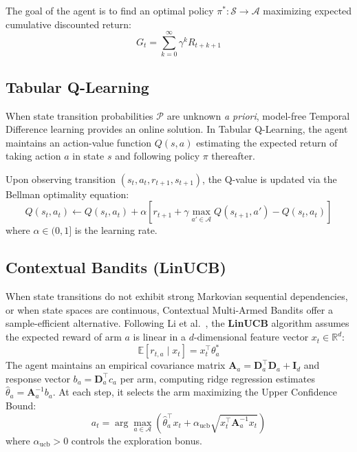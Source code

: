 The goal of the agent is to find an optimal policy $\pi^* : \mathcal{S} \rightarrow \mathcal{A}$ maximizing expected cumulative discounted return:
\begin{equation}
    G_t = \sum_{k=0}^{\infty} \gamma^k R_{t+k+1}
\end{equation}

\subsection{Tabular Q-Learning}
When state transition probabilities $\mathcal{P}$ are unknown \textit{a priori}, model-free Temporal Difference learning provides an online solution. In Tabular Q-Learning, the agent maintains an action-value function $Q(s, a)$ estimating the expected return of taking action $a$ in state $s$ and following policy $\pi$ thereafter.

Upon observing transition $(s_t, a_t, r_{t+1}, s_{t+1})$, the Q-value is updated via the Bellman optimality equation:
\begin{equation}
    Q(s_t, a_t) \leftarrow Q(s_t, a_t) + \alpha \left[ r_{t+1} + \gamma \max_{a' \in \mathcal{A}} Q(s_{t+1}, a') - Q(s_t, a_t) \right]
\end{equation}
where $\alpha \in (0, 1]$ is the learning rate.

\subsection{Contextual Bandits (LinUCB)}
When state transitions do not exhibit strong Markovian sequential dependencies, or when state spaces are continuous, Contextual Multi-Armed Bandits offer a sample-efficient alternative. Following Li et al.~\cite{li2010contextual}, the \textbf{LinUCB} algorithm assumes the expected reward of arm $a$ is linear in a $d$-dimensional feature vector $x_t \in \mathbb{R}^d$:
\begin{equation}
    \mathbb{E}[r_{t, a} \mid x_t] = x_t^\top \theta_a^*
\end{equation}
The agent maintains an empirical covariance matrix $\mathbf{A}_a = \mathbf{D}_a^\top \mathbf{D}_a + \mathbf{I}_d$ and response vector $b_a = \mathbf{D}_a^\top c_a$ per arm, computing ridge regression estimates $\hat{\theta}_a = \mathbf{A}_a^{-1} b_a$. At each step, it selects the arm maximizing the Upper Confidence Bound:
\begin{equation}
    a_t = \arg\max_{a \in \mathcal{A}} \left( \hat{\theta}_a^\top x_t + \alpha_{\text{ucb}} \sqrt{x_t^\top \mathbf{A}_a^{-1} x_t} \right)
\end{equation}
where $\alpha_{\text{ucb}} > 0$ controls the exploration bonus.

